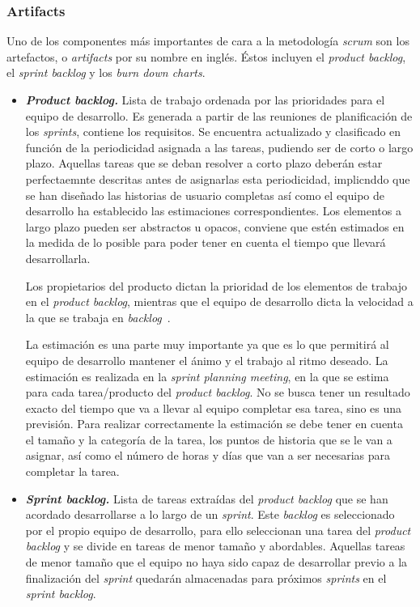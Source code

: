 \subsubsection{Artifacts}
Uno de los componentes más importantes de cara a la metodología \textit{scrum} son los artefactos, o \textit{artifacts} por su nombre en inglés. Éstos incluyen el \textit{product backlog}, el \textit{sprint backlog} y los \textit{burn down charts}.
\begin{itemize}
\item \textbf{\textit{Product backlog.}} Lista de trabajo ordenada por las prioridades para el equipo de desarrollo. Es generada a partir de las reuniones de planificación de los \textit{sprints}, contiene los requisitos. Se encuentra actualizado y clasificado en función de la periodicidad asignada a las tareas, pudiendo ser de corto o largo plazo. Aquellas tareas que se deban resolver a corto plazo deberán estar perfectaemnte descritas antes de asignarlas esta periodicidad, implicnddo que se han diseñado las historias de usuario completas así como el equipo de desarrollo ha establecido las estimaciones correspondientes. Los elementos a largo plazo pueden ser abstractos u opacos, conviene que estén estimados en la medida de lo posible para poder tener en cuenta el tiempo que llevará desarrollarla.

Los propietarios del producto dictan la prioridad de los elementos de trabajo en el \textit{product backlog}, mientras que el equipo de desarrollo dicta la velocidad a la que se trabaja en \textit{backlog}~\cite{danradigan2021}.

La estimación es una parte muy importante ya que es lo que permitirá al equipo de desarrollo mantener el ánimo y el trabajo al ritmo deseado. La estimación es realizada en la \textit{sprint planning meeting}, en la que se estima para cada tarea/producto del \textit{product backlog}. No se busca tener un resultado exacto del tiempo que va a llevar al equipo completar esa tarea, sino es una previsión. Para realizar correctamente la estimación se debe tener en cuenta el tamaño y la categoría de la tarea, los puntos de historia que se le van a asignar, así como el número de horas y días que van a ser necesarias para completar la tarea. 

\item \textbf{\textit{Sprint backlog.}} Lista de tareas extraídas del \textit{product backlog} que se han acordado desarrollarse a lo largo de un \textit{sprint}. Este \textit{backlog} es seleccionado por el propio equipo de desarrollo, para ello seleccionan una tarea del \textit{product backlog} y se divide en tareas de menor tamaño y abordables. Aquellas tareas de menor tamaño que el equipo no haya sido capaz de desarrollar previo a la finalización del \textit{sprint} quedarán almacenadas para próximos \textit{sprints} en el \textit{sprint backlog}.
\end{itemize}

